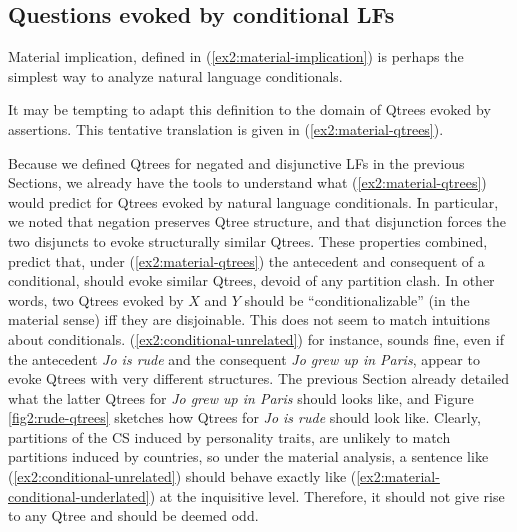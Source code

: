 \subsection{Questions evoked by conditional LFs}

Material implication, defined in (\ref{ex2:material-implication}) is perhaps the simplest way to analyze natural language conditionals. 

\begin{exe}
	\label{ex2:material-implication}
\end{exe}

It may be tempting to adapt this definition to the domain of Qtrees evoked by assertions. This tentative translation is given in (\ref{ex2:material-qtrees}). 

\begin{exe}
	\label{ex2:material-qtrees}
\end{exe}

Because we defined Qtrees for negated and disjunctive LFs in the previous Sections, we already have the tools to understand what (\ref{ex2:material-qtrees}) would predict for Qtrees evoked by natural language conditionals. In particular, we noted that negation preserves Qtree structure, and that disjunction forces the two disjuncts to evoke structurally similar Qtrees. These properties combined, predict that, under (\ref{ex2:material-qtrees}) the antecedent and consequent of a conditional, should evoke similar Qtrees, devoid of any partition clash. In other words, two Qtrees evoked by $X$ and $Y$ should be ``conditionalizable'' (in the material sense) iff they are disjoinable. This does not seem to match intuitions about conditionals. (\ref{ex2:conditional-unrelated}) for instance, sounds fine, even if the antecedent \textit{Jo is rude} and the consequent \textit{Jo grew up in Paris}, appear to evoke Qtrees with very different structures. The previous Section already detailed what the latter Qtrees for \textit{Jo grew up in Paris} should looks like, and Figure \ref{fig2:rude-qtrees} sketches how Qtrees for \textit{Jo is rude} should look like. Clearly, partitions of the CS induced by personality traits, are unlikely to match partitions induced by countries, so under the material analysis, a sentence like (\ref{ex2:conditional-unrelated}) should behave exactly like (\ref{ex2:material-conditional-underlated}) at the inquisitive level. Therefore, it should not give rise to any Qtree and should be deemed odd.

